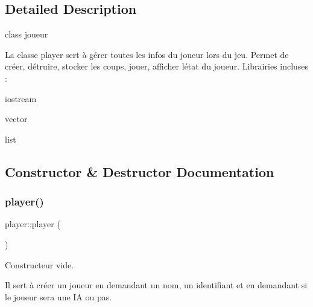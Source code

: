 \subsection{Detailed Description}
class joueur 

La classe player sert à gérer toutes les infos du joueur lors du jeu. Permet de créer, détruire, stocker les coups, jouer, afficher l\textquotesingle{}état du joueur. Librairies incluses \+:
\begin{DoxyItemize}
\item iostream
\item vector
\item list 
\end{DoxyItemize}

\subsection{Constructor \& Destructor Documentation}
\mbox{\label{classplayer_a97de83bce15f880241f561b55b016b02}} 
\subsubsection{\texorpdfstring{player()}{player()}}
{\footnotesize\ttfamily player\+::player (\begin{DoxyParamCaption}{ }\end{DoxyParamCaption})}



Constructeur vide. 

Il sert à créer un joueur en demandant un nom, un identifiant et en demandant si le joueur sera une IA ou pas.

